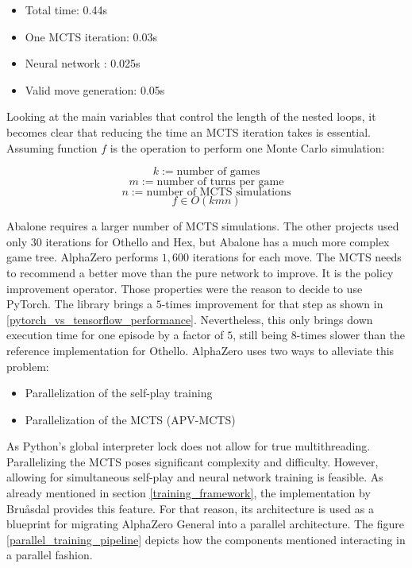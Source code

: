 \begin{itemize}
    \item Total time: 0.44s
    \item One MCTS iteration: 0.03s
    \item Neural network : 0.025s
    \item Valid move generation: 0.05s
\end{itemize}

Looking at the main variables that control the length of the nested loops, it becomes clear that reducing the time an MCTS iteration takes is essential. Assuming function $f$ is the operation to perform one Monte Carlo simulation:

$$
    k := \text{number of games}
$$
$$
    m := \text{number of turns per game}
$$
$$
    n := \text{number of MCTS simulations}
$$
$$
    f \in O(kmn)
$$

Abalone requires a larger number of MCTS simulations. The other projects \cite{bruasdal_deep_2020,thakoor_learning_nodate} used only 30 iterations for Othello and Hex, but Abalone has a much more complex game tree. AlphaZero performs $1,600$ iterations \cite[p. 11]{silver_mastering_2017} for each move. The MCTS needs to recommend a better move than the pure network to improve. It is the policy improvement operator. Those properties were the reason to decide to use PyTorch. The library brings a $5$-times improvement for that step as shown in \ref{pytorch_vs_tensorflow_performance}. Nevertheless, this only brings down execution time for one episode by a factor of $5$, still being $8$-times slower than the reference implementation for Othello. AlphaZero uses two ways to alleviate this problem:

\begin{itemize}
    \item Parallelization of the self-play training
    \item Parallelization of the MCTS (APV-MCTS)
\end{itemize}

As Python's global interpreter lock \cite{noauthor_globalinterpreterlock_nodate} does not allow for true multithreading. Parallelizing the MCTS poses significant complexity and difficulty. However, allowing for simultaneous self-play and neural network training is feasible. As already mentioned in section \ref{training_framework}, the implementation by Bruåsdal \cite{bruasdal_deep_2020} provides this feature. For that reason, its architecture is used as a blueprint for migrating AlphaZero General into a parallel architecture. The figure \ref{parallel_training_pipeline} depicts how the components mentioned interacting in a parallel fashion.

